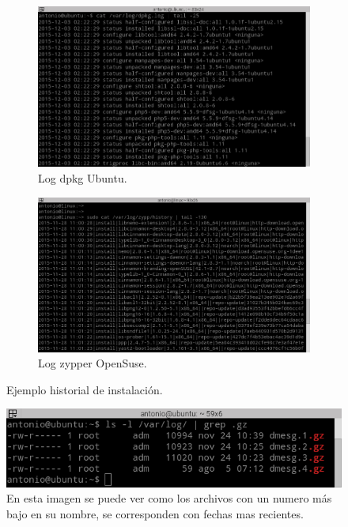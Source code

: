 \begin{figure}[H]
    \centering
    \begin{subfigure}[b]{0.8\textwidth}
        \includegraphics[width=\textwidth]{imagenes/logu}
        \caption{Log dpkg Ubuntu.}
    \end{subfigure}
    \begin{subfigure}[b]{0.8\textwidth}
        \includegraphics[width=\textwidth]{imagenes/logs}
        \caption{Log zypper OpenSuse.}
    \end{subfigure}
    \caption{Ejemplo historial de instalación.}
    \label{fig16}
\end{figure}

\begin{figure}[H]
  \begin{center}
    \includegraphics[width=1\textwidth]{imagenes/rot}
    \caption{En esta imagen se puede ver como los archivos con un numero más bajo en su nombre, se corresponden con fechas mas recientes.}
    \label{fig17}
  \end{center}
\end{figure}

